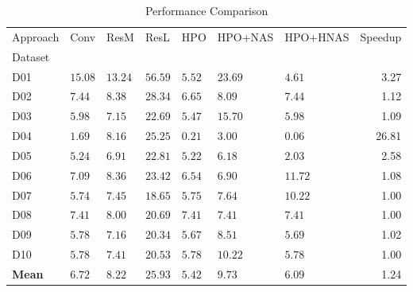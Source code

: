 \begin{table}
\caption{Performance Comparison}
\label{tab:results}
\begin{tabular}{lllllllr}
\toprule
Approach & Conv & ResM & ResL & HPO & HPO+NAS & HPO+HNAS & Speedup \\
Dataset &  &  &  &  &  &  &  \\
\midrule
D01 & $15.08$ & $13.24$ & $56.59$ & $5.52$ & $23.69$ & $\mathbf{4.61}$ & 3.27 \\
D02 & $7.44$ & $8.38$ & $28.34$ & $\mathbf{6.65}$ & $8.09$ & $7.44$ & 1.12 \\
D03 & $5.98$ & $7.15$ & $22.69$ & $\mathbf{5.47}$ & $15.70$ & $5.98$ & 1.09 \\
D04 & $1.69$ & $8.16$ & $25.25$ & $0.21$ & $3.00$ & $\mathbf{0.06}$ & 26.81 \\
D05 & $5.24$ & $6.91$ & $22.81$ & $5.22$ & $6.18$ & $\mathbf{2.03}$ & 2.58 \\
D06 & $7.09$ & $8.36$ & $23.42$ & $\mathbf{6.54}$ & $6.90$ & $11.72$ & 1.08 \\
D07 & $\mathbf{5.74}$ & $7.45$ & $18.65$ & $5.75$ & $7.64$ & $10.22$ & 1.00 \\
D08 & $\mathbf{7.41}$ & $8.00$ & $20.69$ & $\mathbf{7.41}$ & $\mathbf{7.41}$ & $\mathbf{7.41}$ & 1.00 \\
D09 & $5.78$ & $7.16$ & $20.34$ & $\mathbf{5.67}$ & $8.51$ & $5.69$ & 1.02 \\
D10 & $\mathbf{5.78}$ & $7.41$ & $20.53$ & $\mathbf{5.78}$ & $10.22$ & $\mathbf{5.78}$ & 1.00 \\
\textbf{Mean} & $6.72$ & $8.22$ & $25.93$ & $\mathbf{5.42}$ & $9.73$ & $6.09$ & 1.24 \\
\bottomrule
\end{tabular}
\end{table}
